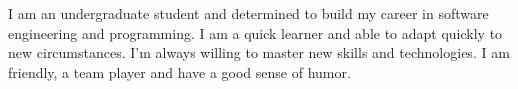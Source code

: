 

\begin{cvparagraph}

I am an undergraduate student and determined to build my career in software engineering and programming. I am a quick learner and able to adapt quickly to new circumstances. I'm always willing to master new skills and technologies. I am friendly, a team player and have a good sense of humor.
\end{cvparagraph}
